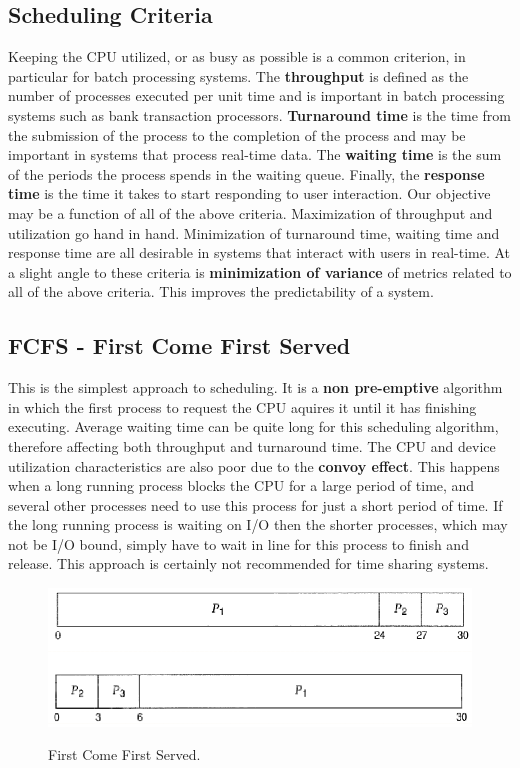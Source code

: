 \documentclass[10pt,a4paper]{article}
\begin{document}
\subsection{Scheduling Criteria}
Keeping the CPU utilized, or as busy as possible is a common criterion, in particular for batch processing systems. The {\bf throughput} is defined as the number of processes executed per unit time and is important in batch processing systems such as bank transaction processors. {\bf Turnaround time} is the time from the submission of the process to the completion of the process and may be important in systems that process real-time data. The {\bf waiting time} is the sum of the periods the process spends in the waiting queue. Finally, the {\bf response time} is the time it takes to start responding to user interaction. 
\newline\newline
Our objective may be a function of all of the above criteria. Maximization of throughput and utilization go hand in hand. Minimization of turnaround time, waiting time and response time are all desirable in systems that interact with users in real-time. At a slight angle to these criteria is {\bf minimization of variance} of metrics related to all of the above criteria. This improves the predictability of a system. 
\subsection{FCFS - First Come First Served}
This is the simplest approach to scheduling. It is a {\bf non pre-emptive} algorithm in which the first process to request the CPU aquires it until it has finishing executing. Average waiting time can be quite long for this scheduling algorithm, therefore affecting both throughput and turnaround time. The CPU and device utilization characteristics are also poor due to the {\bf convoy effect}. This happens when a long running process blocks the CPU for a large period of time, and several other processes need to use this process for just a short period of time. If the long running process is waiting on I/O then the shorter processes, which may not be I/O bound, simply have to wait in line for this process to finish and release. This approach is certainly not recommended for time sharing systems.  
\begin{figure}
\caption{First Come First Served. \cite{OSCONCEPTS}}
\begin{center}
\includegraphics[scale=0.45]{../images/fcfs-sched.png}
\label{fcfs}
\end{center}
\end{figure}
\end{document}

